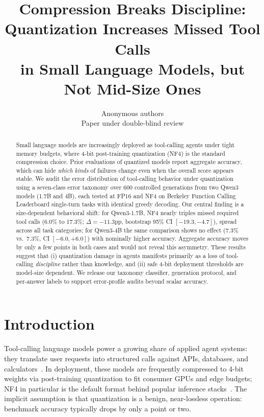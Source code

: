 \documentclass{article}
\title{Compression Breaks Discipline: Quantization Increases Missed Tool Calls\\in Small Language Models, but Not Mid-Size Ones}
\author{
  Anonymous authors\\
  Paper under double-blind review
}
\begin{document}
\maketitle

\begin{abstract}
Small language models are increasingly deployed as tool-calling agents under
tight memory budgets, where 4-bit post-training quantization (NF4) is the
standard compression choice. Prior evaluations of quantized models report
aggregate accuracy, which can hide \emph{which kinds} of failures change even
when the overall score appears stable. We audit the error distribution of
tool-calling behavior under quantization using a seven-class error taxonomy
over 600 controlled generations from two Qwen3 models (1.7B and 4B), each
tested at FP16 and NF4 on Berkeley Function Calling Leaderboard single-turn
tasks with identical greedy decoding. Our central finding is a size-dependent
behavioral shift: for Qwen3-1.7B, NF4 nearly triples missed required tool
calls (6.0\% to 17.3\%; $\Delta=-11.3$pp, bootstrap 95\% CI $[-19.3,-4.7]$),
spread across all task categories; for Qwen3-4B the same comparison shows no
effect (7.3\% vs.\ 7.3\%, CI $[-6.0,+6.0]$) with nominally higher accuracy.
Aggregate accuracy moves by only a few points in both cases and would not
reveal this asymmetry. These results suggest that (i) quantization damage in
agents manifests primarily as a loss of tool-calling \emph{discipline} rather
than knowledge, and (ii) safe 4-bit deployment thresholds are model-size
dependent. We release our taxonomy classifier, generation protocol, and
per-answer labels to support error-profile audits beyond scalar accuracy.
\end{abstract}

\section{Introduction}
\label{sec:intro}

Tool-calling language models power a growing share of applied agent systems:
they translate user requests into structured calls against APIs, databases,
and calculators~\citep{schick2023toolformer,yao2023react}. In deployment,
these models are frequently compressed to 4-bit weights via post-training
quantization to fit consumer GPUs and edge budgets; NF4 in particular is the
default format behind popular inference stacks~\citep{dettmers2023qlora}.
The implicit assumption is that quantization is a benign, near-lossless
operation: benchmark accuracy typically drops by only a point or two.
\end{document}
